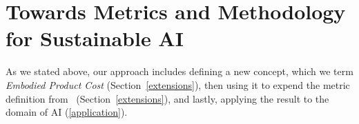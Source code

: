 \section{Towards Metrics and Methodology for Sustainable AI}
\label{metrics}
As we stated above, our approach includes defining 
a new concept, which we term {\em Embodied Product Cost} (Section~\ref{extensions}),
then using it to expend the metric definition from~\cite{gandhi2022metrics} (Section~\ref{extensions}), and lastly, applying the result to the domain of AI (\ref{application}).
%
